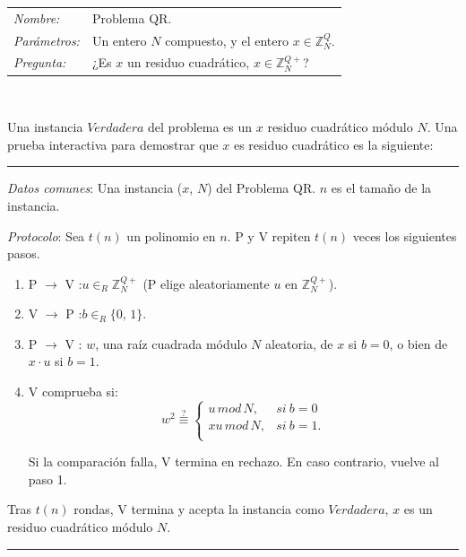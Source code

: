 \hfil

\begin{tabular}{|ll}
	\textit{Nombre:} & Problema QR. \\
	\textit{Parámetros:} & Un entero $N$ compuesto, y el entero $x\in \mathbb{Z}^Q_N$. \\
	\textit{Pregunta:} & ¿Es $x$ un residuo cuadrático, $x \in \mathbb{Z}^{Q+}_N$? \\
\end{tabular}
\\

\hfil

Una instancia $Verdadera$ del problema es un $x$ residuo cuadrático módulo $N$. Una prueba interactiva para demostrar que $x$ es residuo cuadrático es la siguiente:

\hfil

\rule{\textwidth}{1pt}
\begin{algorithm}
	
	\hfil
	
	\textit{Datos comunes}: Una instancia ($x$, $N$) del Problema QR. $n$ es el tamaño de la instancia.
	
	\textit{Protocolo}: Sea $t(n)$ un polinomio en $n$. P y V repiten $t(n)$ veces los siguientes pasos.
	
	\begin{enumerate}
		
		\item P $\rightarrow$ V :\quad $u \in_R \mathbb{Z}^{Q+}_N$ \quad (P elige aleatoriamente $u$ en $\mathbb{Z}^{Q+}_N$).
		
		\item V $\rightarrow$ P :\quad $b \in_R \{0,\,1\}$.
		
		\item P $\rightarrow$ V :\; $w$,\; una raíz cuadrada módulo $N$ aleatoria, de $x$ si $b=0$, o bien de $x\cdot u$ si $b=1$.
		
		\item V comprueba si:
		\[
			w^2 \overset{?}{\equiv}
			\begin{cases}
				u\, mod\, N, & si\ b = 0\\
				xu\, mod\, N, & si\ b = 1.\\
			\end{cases}
		\]
		
		Si la comparación falla, V termina en rechazo. En caso contrario, vuelve al paso 1.
		
		
	\end{enumerate}

	Tras $t(n)$ rondas, V termina y acepta la instancia como $Verdadera$, $x$ es un residuo cuadrático módulo $N$.
	
	\label{QRinteractive:alg}
\end{algorithm}
\rule{\textwidth}{1pt}

